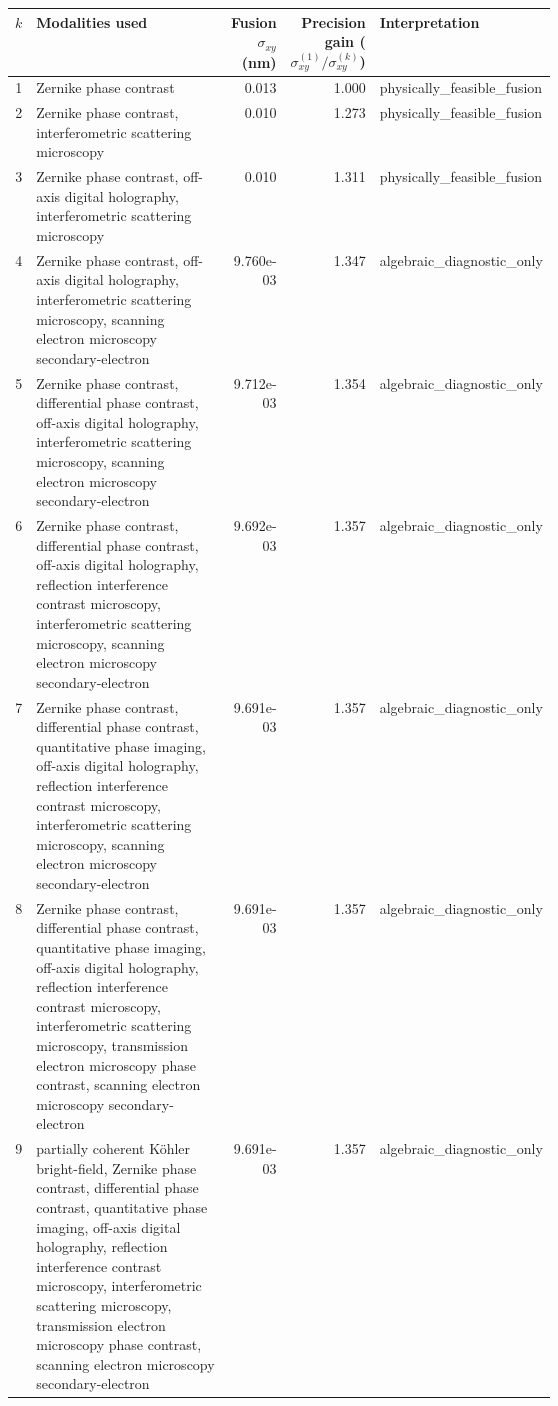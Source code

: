 \begin{tabular}{r p{0.43\linewidth} r r p{0.20\linewidth}}
\toprule
$k$ & Modalities used & Fusion $\sigma_{xy}$ (nm) & Precision gain ($\sigma_{xy}^{(1)}/\sigma_{xy}^{(k)}$) & Interpretation \\
\midrule
1 & Zernike phase contrast & 0.013 & 1.000 & physically\_feasible\_fusion \\
2 & Zernike phase contrast, interferometric scattering microscopy & 0.010 & 1.273 & physically\_feasible\_fusion \\
3 & Zernike phase contrast, off-axis digital holography, interferometric scattering microscopy & 0.010 & 1.311 & physically\_feasible\_fusion \\
4 & Zernike phase contrast, off-axis digital holography, interferometric scattering microscopy, scanning electron microscopy secondary-electron & 9.760e-03 & 1.347 & algebraic\_diagnostic\_only \\
5 & Zernike phase contrast, differential phase contrast, off-axis digital holography, interferometric scattering microscopy, scanning electron microscopy secondary-electron & 9.712e-03 & 1.354 & algebraic\_diagnostic\_only \\
6 & Zernike phase contrast, differential phase contrast, off-axis digital holography, reflection interference contrast microscopy, interferometric scattering microscopy, scanning electron microscopy secondary-electron & 9.692e-03 & 1.357 & algebraic\_diagnostic\_only \\
7 & Zernike phase contrast, differential phase contrast, quantitative phase imaging, off-axis digital holography, reflection interference contrast microscopy, interferometric scattering microscopy, scanning electron microscopy secondary-electron & 9.691e-03 & 1.357 & algebraic\_diagnostic\_only \\
8 & Zernike phase contrast, differential phase contrast, quantitative phase imaging, off-axis digital holography, reflection interference contrast microscopy, interferometric scattering microscopy, transmission electron microscopy phase contrast, scanning electron microscopy secondary-electron & 9.691e-03 & 1.357 & algebraic\_diagnostic\_only \\
9 & partially coherent Köhler bright-field, Zernike phase contrast, differential phase contrast, quantitative phase imaging, off-axis digital holography, reflection interference contrast microscopy, interferometric scattering microscopy, transmission electron microscopy phase contrast, scanning electron microscopy secondary-electron & 9.691e-03 & 1.357 & algebraic\_diagnostic\_only \\

\end{tabular}
